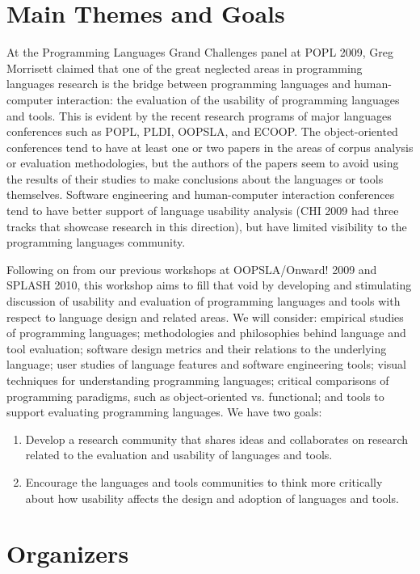 \documentclass{sigplanconf}
\begin{document}
\section{Main Themes and Goals}

At the Programming Languages Grand Challenges panel at POPL 2009, Greg
Morrisett claimed that one of the great neglected areas in programming
languages research is the bridge between programming languages and
human-computer interaction: the evaluation of the usability of
programming languages and tools. This is evident by the recent
research programs of major languages conferences such as POPL, PLDI,
OOPSLA, and ECOOP. The object-oriented conferences tend to have at
least one or two papers in the areas of corpus analysis or evaluation
methodologies, but the authors of the papers seem to avoid using the
results of their studies to make conclusions about the languages or
tools themselves. Software engineering and human-computer interaction
conferences tend to have better support of language usability analysis
(CHI 2009 had three tracks that showcase research in this direction),
but have limited visibility to the programming languages community.

Following on from our previous workshops at OOPSLA/Onward! 
2009 and SPLASH 2010, this workshop aims to fill that void by
developing and stimulating discussion of usability and evaluation of
programming languages and tools with respect to language design and
related areas. We will consider: empirical studies of programming
languages; methodologies and philosophies behind language and tool
evaluation; software design metrics and their relations to the
underlying language; user studies of language features and software
engineering tools; visual techniques for understanding programming
languages; critical comparisons of programming paradigms, such as
object-oriented vs. functional; and tools to support evaluating
programming languages. We have two goals:

\begin{enumerate}
  \item 
Develop a research community that shares ideas and collaborates on 
research related to the evaluation and usability of languages and tools.
\item
Encourage the languages and tools communities to think more critically
about how usability affects the  design and adoption of languages and tools.
\end{enumerate}


\section{Organizers}
\end{document}
